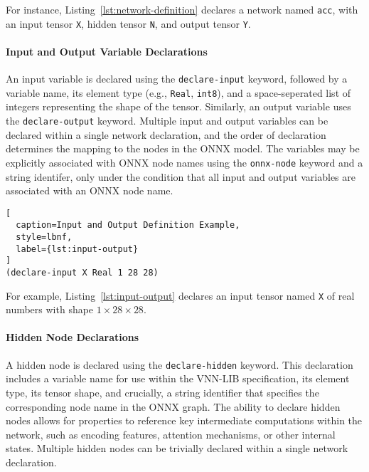 For instance, Listing~\ref{lst:network-definition} declares a network named \texttt{acc}, with an input tensor \texttt{X}, hidden tensor \texttt{N}, 
and output tensor \texttt{Y}. 



\paragraph{Input and Output Variable Declarations}
An input variable is declared using the \texttt{declare-input} keyword, followed by a variable name, its element type (e.g., \texttt{Real}, \texttt{int8}), 
and a space-seperated list of integers representing the shape of the tensor. Similarly, an output variable uses the \texttt{declare-output} keyword. Multiple 
input and output variables can be declared within a single network declaration, and the order of declaration determines the mapping to the nodes in the ONNX model.
The variables may be explicitly associated with ONNX node names using the \texttt{onnx-node} keyword and a string identifer, only under the condition that all input 
and output variables are associated with an ONNX node name.

\begin{lstlisting}[
  caption=Input and Output Definition Example,
  style=lbnf,
  label={lst:input-output}
]
(declare-input X Real 1 28 28) 
\end{lstlisting}

For example, Listing~\ref{lst:input-output} declares an input tensor named \texttt{X} of real numbers with shape $1 \times 28 \times 28$. 

\paragraph{Hidden Node Declarations}
A hidden node is declared using the \texttt{declare-hidden} keyword. This declaration includes a variable name for use within the VNN-LIB specification, 
its element type, its tensor shape, and crucially, a string identifier that specifies the corresponding node name in the ONNX graph. The ability to declare hidden nodes
allows for properties to reference key intermediate computations within the network, such as encoding features, attention mechanisms, or other internal states. Multiple
hidden nodes can be trivially declared within a single network declaration.

